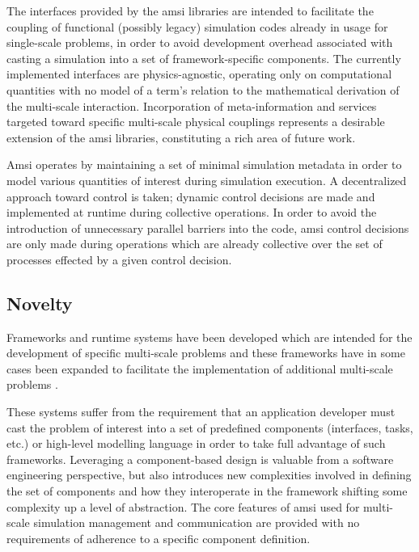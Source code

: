 \documentclass[11pt]{siamltex1213}
\begin{document}
The interfaces provided by the amsi libraries are intended to facilitate the coupling of functional (possibly legacy) simulation codes already in usage for single-scale problems, in order to avoid development overhead associated with casting a simulation into a set of framework-specific components. The currently implemented interfaces are physics-agnostic, operating only on computational quantities with no model of a term's relation to the mathematical derivation of the multi-scale interaction. Incorporation of meta-information and services targeted toward specific multi-scale physical couplings represents a desirable extension of the amsi libraries, constituting a rich area of future work.

Amsi operates by maintaining a set of minimal simulation metadata in order to model various quantities of interest during simulation execution. A decentralized approach toward control is taken; dynamic control decisions are made and implemented at runtime during collective operations. In order to avoid the introduction of unnecessary parallel barriers into the code, amsi control decisions are only made during operations which are already collective over the set of processes effected by a given control decision.

\subsection{Novelty} %
Frameworks and runtime systems have been developed which are intended for the development of specific multi-scale problems \cite{parker2006component} \cite{chopard2011framework} \cite{} and these frameworks have in some cases been expanded to facilitate the implementation of additional multi-scale problems \cite{berzins2010uintah}.

These systems suffer from the requirement that an application developer must cast the problem of interest into a set of predefined components (interfaces, tasks, etc.) or high-level modelling language in order to take full advantage of such frameworks. Leveraging a component-based design is valuable from a software engineering perspective, but also introduces new complexities involved in defining the set of components and how they interoperate in the framework shifting some complexity up a level of abstraction. The core features of amsi used for multi-scale simulation management and communication are provided with no requirements of adherence to a specific component definition.
\end{document}

